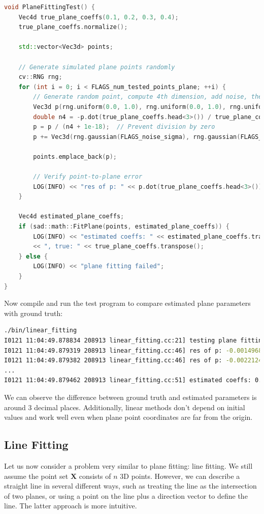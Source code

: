 \begin{lstlisting}[language=c++,caption=src/ch5/linear\_fitting.cc]
void PlaneFittingTest() {
	Vec4d true_plane_coeffs(0.1, 0.2, 0.3, 0.4);
	true_plane_coeffs.normalize();
	
	std::vector<Vec3d> points;
	
	// Generate simulated plane points randomly
	cv::RNG rng;
	for (int i = 0; i < FLAGS_num_tested_points_plane; ++i) {
		// Generate random point, compute 4th dimension, add noise, then normalize
		Vec3d p(rng.uniform(0.0, 1.0), rng.uniform(0.0, 1.0), rng.uniform(0.0, 1.0));
		double n4 = -p.dot(true_plane_coeffs.head<3>()) / true_plane_coeffs[3];
		p = p / (n4 + 1e-18);  // Prevent division by zero
		p += Vec3d(rng.gaussian(FLAGS_noise_sigma), rng.gaussian(FLAGS_noise_sigma), rng.gaussian(FLAGS_noise_sigma));
		
		points.emplace_back(p);
		
		// Verify point-to-plane error
		LOG(INFO) << "res of p: " << p.dot(true_plane_coeffs.head<3>()) + true_plane_coeffs[3];
	}
	
	Vec4d estimated_plane_coeffs;
	if (sad::math::FitPlane(points, estimated_plane_coeffs)) {
		LOG(INFO) << "estimated coeffs: " << estimated_plane_coeffs.transpose()
		<< ", true: " << true_plane_coeffs.transpose();
	} else {
		LOG(INFO) << "plane fitting failed";
	}
}
\end{lstlisting}

Now compile and run the test program to compare estimated plane parameters with ground truth:
\begin{lstlisting}[language=sh,caption=Terminal output:]
./bin/linear_fitting 
I0121 11:04:49.878834 208913 linear_fitting.cc:21] testing plane fitting
I0121 11:04:49.879319 208913 linear_fitting.cc:46] res of p: -0.00149684
I0121 11:04:49.879382 208913 linear_fitting.cc:46] res of p: -0.00221244
...
I0121 11:04:49.879462 208913 linear_fitting.cc:51] estimated coeffs: 0.186755 0.363656 0.546692 0.730757, true: 0.182574 0.365148 0.547723 0.730297
\end{lstlisting}

We can observe the difference between ground truth and estimated parameters is around 3 decimal places. Additionally, linear methods don't depend on initial values and work well even when plane point coordinates are far from the origin.

\subsection{Line Fitting}
\label{sec:line-fitting}
Let us now consider a problem very similar to plane fitting: line fitting. We still assume the point set $\mathbf{X}$ consists of $n$ 3D points. However, we can describe a straight line in several different ways, such as treating the line as the intersection of two planes, or using a point on the line plus a direction vector to define the line. The latter approach is more intuitive.

